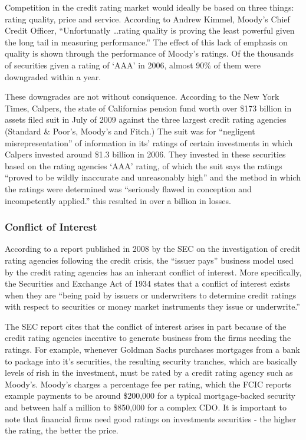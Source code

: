\documentclass[11pt]{article}
\begin{document}
\begin{multicols}{2}
Competition in the credit rating market would ideally be based on three things: rating quality, price and service. \cite[p. 210]{govtReport} According to Andrew Kimmel, Moody's Chief Credit Officer, ``Unfortunatly \ldots rating quality is proving the least powerful given the long tail in measuring performance.''  The effect of this lack of emphasis on quality is shown through the performance of Moody's ratings.  Of the thousands of securities given a rating of `AAA' in 2006, almost 90\% of them were downgraded within a year. \cite{ratingEthics, govtReport}

These downgrades are not without consiquence.  According to the New York Times, Calpers, the state of Californias pension fund worth over \$173 billion in assets filed suit in July of 2009 against the three largest credit rating agencies (Standard \& Poor's, Moody's and Fitch.) The suit was for ``negligent misrepresentation'' of information in its' ratings of certain investments in which Calpers invested around \$1.3 billion in 2006.  They invested in these securities based on the rating agencies `AAA' rating, of which the suit says the ratings ``proved to be wildly inaccurate and unreasonably high'' and the method in which the ratings were determined was ``seriously flawed in conception and incompetently applied.''  this resulted in over a billion in losses. \cite{nyTimesCalpers} 

\subsubsection{Conflict of Interest}

According to a report published in 2008 by the SEC on the investigation of credit rating agencies following the credit crisis, the ``issuer pays'' business model used by the credit rating agencies has an inherant conflict of interest. \cite[p.23]{secCRAreport}  More specifically, the Securities and Exchange Act of 1934 states that a conflict of interest exists when they are ``being paid by issuers or underwriters to determine credit ratings with respect to securities or money market instruments they issue or underwrite.'' \cite[Rule 17g-5(b)(1)]{SEA} 

The SEC report cites that the conflict of interest arises in part because of the credit rating agencies incentive to generate business from the firms needing the ratings. \cite{secCRAreport}  For example, whenever Goldman Sachs purchases mortgages from a bank to package into it's securities, the resulting security tranches, which are basically levels of rish in the investment, must be rated by a credit rating agency such as Moody's.  Moody's charges a percentage fee per rating, which the FCIC reports example payments to be around \$200,000 for a typical mortgage-backed security and between half a million to \$850,000 for a complex CDO.\cite[p.146]{govtReport} It is important to note that financial firms need good ratings on investments securities - the higher the rating, the better the price.  


\end{multicols}
\end{document}
